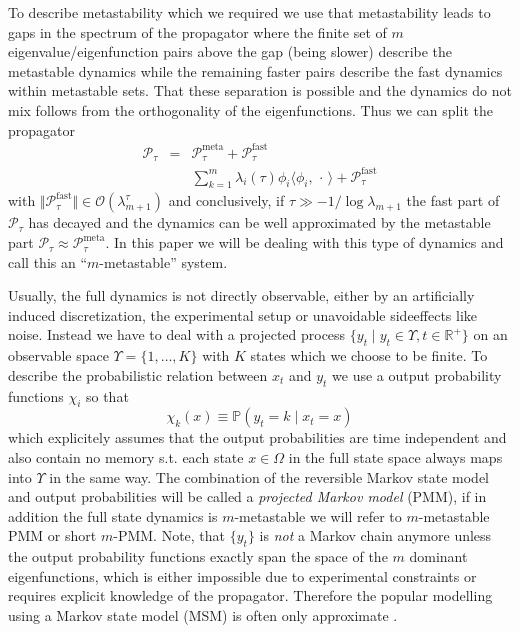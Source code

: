 \documentclass[aps,pre,twocolumn,nofootinbib,superscriptaddress,linenumbers]{revtex4-1}
\begin{document}
To describe metastability which we required we use that metastability
leads to gaps in the spectrum of the propagator \cite{bovier:2005a}
where the finite set of $m$ eigenvalue/eigenfunction pairs above
the gap (being slower) describe the metastable dynamics while the
remaining faster pairs describe the fast dynamics within metastable
sets. That these separation is possible and the dynamics do not mix
follows from the orthogonality of the eigenfunctions. Thus we can
split the propagator
\begin{eqnarray}
\mathcal{P}_{\tau} & = & \mathcal{P}_{\tau}^{\text{meta}}+\mathcal{P}_{\tau}^{\text{fast}}\nonumber \\
 &  & \sum_{k=1}^{m}\lambda_{i}(\tau)\phi_{i}\langle\phi_{i},\,\cdot\,\rangle+\mathcal{P}_{\tau}^{\text{fast}}\label{eq:metastable-dynamics}
\end{eqnarray}
with $\Vert\mathcal{P}_{\tau}^{\text{fast}}\Vert\in\mathcal{O}\left(\lambda_{m+1}^{\tau}\right)$
and conclusively, if $\tau\gg-1/\log\lambda_{m+1}$ the fast part
of $\mathcal{P}_{\tau}$ has decayed and the dynamics can be well
approximated by the metastable part $\mathcal{P}_{\tau}\approx\mathcal{P}_{\tau}^{\text{meta}}$.
In this paper we will be dealing with this type of dynamics and call
this an ``$m$-metastable'' system. 

Usually, the full dynamics is not directly observable, either by an
artificially induced discretization, the experimental setup or unavoidable
sideeffects like noise. Instead we have to deal with a projected process
$\{y_{t}\mid y_{t}\in\Upsilon,t\in\mathbb{R}^{+}\}$ on an observable
space $\Upsilon=\{1,\ldots,K\}$ with $K$ states which we choose
to be finite. To describe the probabilistic relation between $x_{t}$
and $y_{t}$ we use a output probability functions $\chi_{i}$ so
that
\[
\chi_{k}(x)\equiv\mathbb{P}\left(y_{t}=k\mid x_{t}=x\right)
\]
which explicitely assumes that the output probabilities are time independent
and also contain no memory s.t. each state $x\in\Omega$ in the full
state space always maps into $\Upsilon$ in the same way. The combination
of the reversible Markov state model and output probabilities will
be called a \emph{projected Markov model }(PMM), if in addition the
full state dynamics is $m$-metastable we will refer to $m$-metastable
PMM or short $m$-PMM. Note, that $\{y_{t}\}$ is \emph{not} a Markov
chain anymore unless the output probability functions exactly span
the space of the $m$ dominant eigenfunctions, which is either impossible
due to experimental constraints or requires explicit knowledge of
the propagator. Therefore the popular modelling using a Markov state
model (MSM) is often only approximate \cite{Sarich:2010wa}. 
\end{document}
